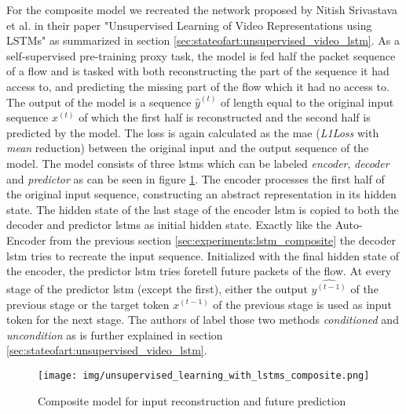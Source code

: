 For the composite model we recreated the network proposed by Nitish Srivastava et al. in their paper "Unsupervised Learning of Video Representations using LSTMs" \cite{unsupervised_learning_lstms} as summarized in section \ref{sec:stateofart:unsupervised_video_lstm}. As a self-supervised pre-training proxy task, the model is fed half the packet sequence of a flow and is tasked with both reconstructing the part of the sequence it had access to, and predicting the missing part of the flow which it had no access to. The output of the model is a sequence $\hat{y}^{(t)}$ of length equal to the original input sequence $x^{(t)}$ of which the first half is reconstructed and the second half is predicted by the model. The loss is again calculated as the \gls{mae} (\textit{L1Loss} with \textit{mean} reduction) between the original input and the output sequence of the model. The model consists of three \glspl{lstm} which can be labeled \textit{encoder}, \textit{decoder} and \textit{predictor} as can be seen in figure \ref{fig:experiments:unsupervised_lstm_composite}. The encoder processes the first half of the original input sequence, constructing an abstract representation in its hidden state. The hidden state of the last stage of the encoder \gls{lstm} is copied to both the decoder and predictor \glspl{lstm} as initial hidden state. Exactly like the Auto-Encoder from the previous section \ref{sec:experiments:lstm_composite} the decoder \gls{lstm} tries to recreate the input sequence. Initialized with the final hidden state of the encoder, the predictor \gls{lstm} tries foretell future packets of the flow. At every stage of the predictor \gls{lstm} (except the first), either the output $\hat{y^{(t-1)}}$ of the previous stage or the target token $x^{(t-1)}$ of the previous stage is used as input token for the next stage. The authors of \cite{unsupervised_learning_lstms} label those two methods \textit{conditioned} and \textit{uncondition} as is further explained in section \ref{sec:stateofart:unsupervised_video_lstm}.


\begin{figure}[h]
	\centering
	\texttt{[image: img/unsupervised\_learning\_with\_lstms\_composite.png]}
	\caption{Composite model for input reconstruction and future prediction \cite{unsupervised_learning_lstms}}
	\label{fig:experiments:unsupervised_lstm_composite}
\end{figure}	


